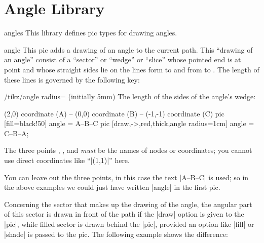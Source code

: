 %
%
%


\section{Angle Library}

\label{section-angle}

\begin{tikzlibrary}{angles}
  This library defines pic types for drawing angles.
\end{tikzlibrary}

\begin{pictype}{angle}{}
  This pic adds a drawing of an angle to the current path. This
  ``drawing of an angle'' consist of a ``sector'' or ``wedge'' or
  ``slice'' whose pointed end is at point  and whose straight
  sides lie on the lines form  to  and from 
  to . The length of these lines is governed by the following
  key:
  \begin{key}{/tikz/angle radius= (initially 5mm)}
    The length of the sides of the angle's wedge:
\begin{codeexample}[]
\tikz \draw (2,0) coordinate (A) -- (0,0) coordinate (B)
         -- (-1,-1) coordinate (C)
           pic [fill=black!50]                      {angle = A--B--C}
           pic [draw,->,red,thick,angle radius=1cm] {angle = C--B--A};
\end{codeexample}
  \end{key}

  The three points , , and  \emph{must} be the
  names of nodes or coordinates; you cannot use direct coordinates like
  ``|(1,1)|'' here.

  You can leave out the three points, in this case the text |A--B--C|
  is used; so in the above examples we could just have written
  |{angle}| in the first pic.

  Concerning the sector that makes up the drawing of the angle, the
  angular part of this sector is drawn in front of the path if the
  |draw| option is given to the |pic|, while filled sector is drawn
  behind the |pic|, provided an option like |fill| or |shade| is
  passed to the pic. The following example shows the difference:


\end{pictype}
